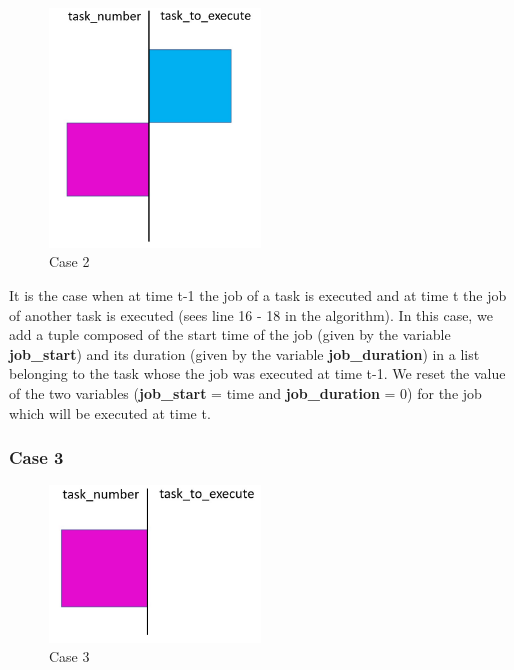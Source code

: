 \documentclass[a4paper,12pt]{article}
\begin{document}
\begin{figure}[h!]
  \centering
  \includegraphics[width=0.5\textwidth]{Resources_tex/Pictures/Case2.jpg}
  \caption{Case 2}
  \label{fig: Case 2}
\end{figure}

\smallskip
\noindent
It is the case when at time t-1 the job of a task is executed and at time t the job of another task is executed (sees line 16 - 18 in the algorithm). In this case, we add a tuple composed of the start time of the job (given by the variable \textbf{job\_start}) and its duration (given by the variable \textbf{job\_duration}) in a list belonging to the task whose the job was executed at time t-1. We reset the value of the two variables (\textbf{job\_start} = time and \textbf{job\_duration} = 0) for the job which will be executed at time t. 

\newpage
\subsubsection{Case 3}

\begin{figure}[h!]
  \centering
  \includegraphics[width=0.5\textwidth]{Resources_tex/Pictures/Case3.jpg}
  \caption{Case 3}
  \label{fig: Case 3}
\end{figure}
\end{document}
